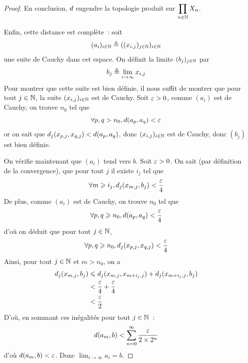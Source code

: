 \begin{proof}
  En conclusion, $d$ engendre la topologie produit sur
  $\displaystyle\prod_{n \in \mathbb N} X_n$.

  Enfin, cette distance est complète~: soit
  \[(a_i)_{i \in \mathbb N} \triangleq ((x_{i,j})_{j\in\mathbb N})_{i \in\mathbb N}\]
  une suite de Cauchy dans cet espace. On définit la limite
  $(b_j)_{j \in \mathbb N}$ par
  \[b_j \triangleq \lim_{i\to\infty} x_{i,j}\]
  Pour montrer que cette suite est bien définie, il nous suffit de montrer que
  pour tout $j\in\mathbb N$, la suite $(x_{i,j})_{i\in\mathbb N}$ est de Cauchy.
  Soit $\varepsilon > 0$, comme $(a_i)$ est de Cauchy, on trouve $n_0$ tel que
  \[\forall p,q > n_0, d(a_p,a_q) < \varepsilon\]
  or on sait que $d_j(x_{p,j},x_{q,j}) < d(a_p,a_q)$, donc
  $(x_{i,j})_{i \in \mathbb N}$ est de Cauchy, donc $(b_j)$ est bien définie.

  On vérifie maintenant que $(a_i)$ tend vers $b$. Soit $\varepsilon > 0$. On sait
  (par définition de la convergence), que pour tout $j$ il existe $i_j$ tel que
  \[\forall m \geqslant i_j, d_j(x_{m,j},b_j) < \frac{\varepsilon}{4}\]
  De plus, comme $(a_i)$ est de Cauchy, on trouve $n_0$ tel que
  \[\forall p,q \geqslant n_0, d(a_p,a_q) < \frac{\varepsilon}{4}\]
  d'où on déduit que pour tout $j \in \mathbb N$,
  \[\forall p,q \geqslant n_0, d_j(x_{p,j},x_{q,j}) < \frac{\varepsilon}{4}\]
  Ainsi, pour tout $j \in \mathbb N$ et $m > n_0$, on a
  \begin{align*}
    d_j(x_{m,j},b_j)
    &\leqslant d_j(x_{m,j},x_{m + i_j,j}) + d_j(x_{m + i_j,j}, b_j)\\
    &< \frac{\varepsilon}{4} + \frac{\varepsilon}{4}\\
    &< \frac{\varepsilon}{2}
  \end{align*}
  D'où, en sommant ces inégalités pour tout $j \in \mathbb N$~:
  \[d(a_m,b) < \sum_{n = 0}^\infty \frac{\varepsilon}{2\times 2^n}\]
  d'où $d(a_m,b) < \varepsilon$. Donc $\lim_{i \to \infty} a_i = b$.
  

\end{proof}
